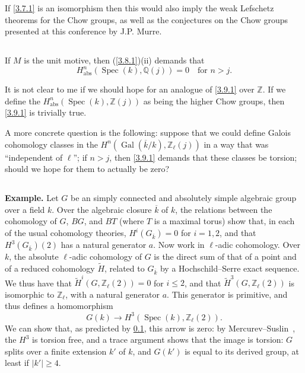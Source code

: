 \documentclass{article}
\theoremstyle{plain}
\theoremstyle{definition}
\newcommand{\ZZ}{\mathbb{Z}}
\newcommand{\QQ}{\mathbb{Q}}
\newcommand{\abs}{\mathrm{abs}}
\renewcommand{\geq}{\geqslant}
\renewcommand{\leq}{\leqslant}
\DeclareMathOperator{\Spec}{Spec}
\DeclareMathOperator{\Gal}{Gal}
\newcommand{\oldpage}[1]{\marginpar{\footnotesize$\Big\vert$ \textit{p.~#1}}}
\begin{document}
If \cref{3.7.1} is an isomorphism then this would also imply the weak Lefschetz theorems for the Chow groups, as well as the conjectures on the Chow groups presented at this conference by J.P. Murre.


\oldpage{159}
\subsection{}
\label{3.9}

If $M$ is the unit motive, then (\ref{3.8.1})(ii) demands that
\[
\label{3.9.1}
  H_\abs^n(\Spec(k),\QQ(j)) = 0 \quad\mbox{for $n>j$}.
\tag{3.9.1}
\]

It is not clear to me if we should hope for an analogue of \cref{3.9.1} over $\ZZ$.
If we define the $H_\abs^n(\Spec(k),\ZZ(j))$ as being the higher Chow groups, then \cref{3.9.1} is trivially true.

A more concrete question is the following: suppose that we could define Galois cohomology classes in the $H^n(\Gal(\overline{k}/k),\ZZ_\ell(j))$ in a way that was ``independent of $\ell$''; if $n>j$, then \cref{3.9.1} demands that these classes be torsion; should we hope for them to actually be zero?


\subsection{}
\label{3.10}

\textbf{Example.}
Let $G$ be an simply connected and absolutely simple algebraic group over a field $k$.
Over the algebraic closure $\overline{k}$ of $k$, the relations between the cohomology of $G$, $BG$, and $BT$ (where $T$ is a maximal torus) show that, in each of the usual cohomology theories, $H^i(G_{\overline{k}})=0$ for $i=1,2$, and that $H^3(G_{\overline{k}})(2)$ has a natural generator $a$.
Now work in $\ell$-adic cohomology.
Over $k$, the absolute $\ell$-adic cohomology of $G$ is the direct sum of that of a point and of a reduced cohomology $\widetilde{H}$, related to $G_{\overline{k}}$ by a Hochschild--Serre exact sequence.
We thus have that $\widetilde{H}^i(G,\ZZ_\ell(2))=0$ for $i\leq2$, and that $\widetilde{H}^3(G,\ZZ_\ell(2))$ is isomorphic to $\ZZ_\ell$, with a natural generator $a$.
This generator is primitive, and thus defines a homomorphism
\[
  G(k) \to H^3(\Spec(k),\ZZ_\ell(2)).
\]
We can show that, as predicted by \cref{3.9}, this arrow is zero:
by Mercurev--Suslin~\cite{27}, the $H^3$ is torsion free, and a trace argument shows that the image is torsion:
$G$ splits over a finite extension $k'$ of $k$, and $G(k')$ is equal to its derived group, at least if $|k'|\geq4$.
\end{document}

